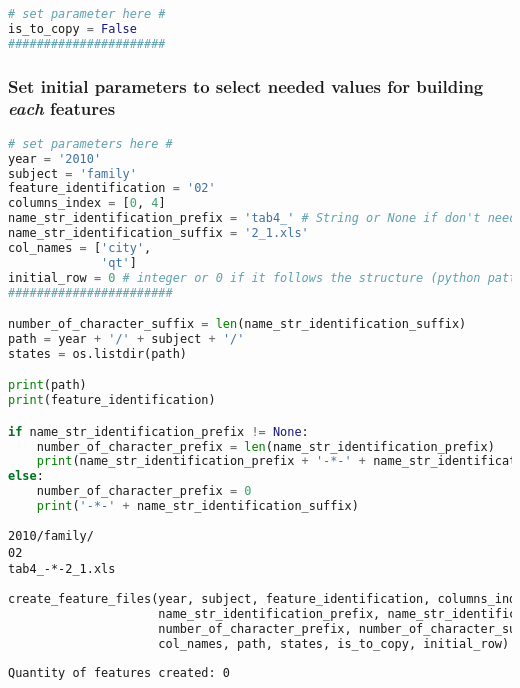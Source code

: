 \begin{lstlisting}[language=Python]
# set parameter here #
is_to_copy = False
######################
\end{lstlisting}

\subsubsection{\texorpdfstring{Set initial parameters to select needed
values for building \emph{each}
features}{Set initial parameters to select needed values for building each features}}\label{set-initial-parameters-to-select-needed-values-for-building-each-features}

\begin{lstlisting}[language=Python]
# set parameters here #
year = '2010'
subject = 'family'
feature_identification = '02'
columns_index = [0, 4]
name_str_identification_prefix = 'tab4_' # String or None if don't need a suffix to search
name_str_identification_suffix = '2_1.xls'
col_names = ['city',
             'qt']
initial_row = 0 # integer or 0 if it follows the structure (python pattern)
#######################

number_of_character_suffix = len(name_str_identification_suffix)
path = year + '/' + subject + '/'
states = os.listdir(path)

print(path)
print(feature_identification)

if name_str_identification_prefix != None:
    number_of_character_prefix = len(name_str_identification_prefix)
    print(name_str_identification_prefix + '-*-' + name_str_identification_suffix)
else:
    number_of_character_prefix = 0
    print('-*-' + name_str_identification_suffix)
\end{lstlisting}

\begin{lstlisting}
2010/family/
02
tab4_-*-2_1.xls
\end{lstlisting}

\begin{lstlisting}[language=Python]
create_feature_files(year, subject, feature_identification, columns_index, 
                     name_str_identification_prefix, name_str_identification_suffix,
                     number_of_character_prefix, number_of_character_suffix,
                     col_names, path, states, is_to_copy, initial_row)
\end{lstlisting}

\begin{lstlisting}
Quantity of features created: 0
\end{lstlisting}

